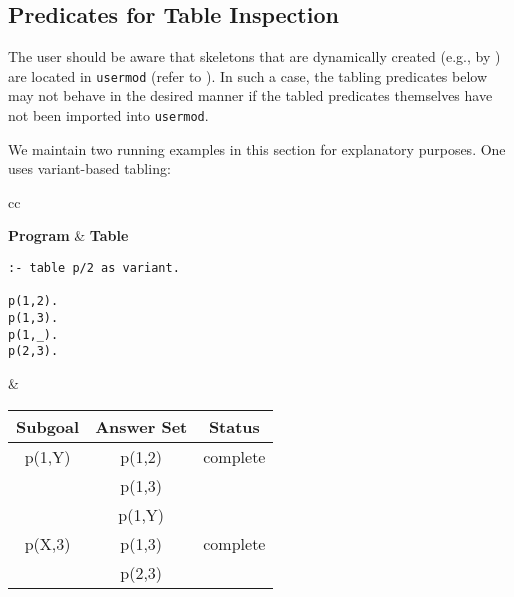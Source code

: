 \begin{description}

%

\end{description}


\subsection{Predicates for Table Inspection}
\label{sec:TablePred:Inspection}

The user should be aware that skeletons that are dynamically created
(e.g., by ) are located in {\tt usermod} (refer to
).  In such a case, the tabling predicates below may
not behave in the desired manner if the tabled predicates themselves
have not been imported into {\tt usermod}.

We maintain two running examples in this section for explanatory
purposes.  One uses variant-based tabling:
%
\begin{center}
\begin{tabular}{cc}\hline \hline
{} \\ \hline \hline
\rule[-2ex]{0ex}{5ex} \textbf{Program} & \textbf{Table} \\
\begin{minipage}{14.5em}
\begin{verbatim}
:- table p/2 as variant.

p(1,2).
p(1,3).
p(1,_).
p(2,3).
\end{verbatim}
\end{minipage}
&
\begin{tabular}{|c|c|c|} \hline
  Subgoal & Answer Set & Status\\ \hline \hline
  p(1,Y) & p(1,2) & complete \\ 
         & p(1,3) & \\
         & p(1,Y) & \\ \hline
  p(X,3) & p(1,3) & complete \\ 
         & p(2,3) & \\ \hline
\end{tabular} \\
\vspace*{-2ex} \\ \hline \hline
\end{tabular}
\end{center}

